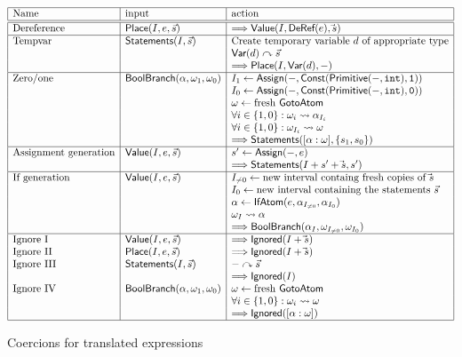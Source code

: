 \begin{docpart}
\begin{figure}\begin{displaymath}\begin{array}{|l|l|l|}
\hline
\mbox{Name} & \mbox{input} & \mbox{action} \\
\hline
\hline
\mbox{Dereference} & \cons{Place}(I,e,\vec s) &
   ==> \cons{Value}(I,\cons{DeRef}(e),\vec s) \\
\hline
\mbox{Tempvar} & \cons{Statements}(I,\vec s) &
   \mbox{Create temporary variable $d$ of appropriate type} \\
&& \installleft{\cons{Var}(d)}{\vec s} \\
&& ==> \cons{Place}(I,\cons{Var}(d),-) \\
\hline
\mbox{Zero/one} & \cons{BoolBranch}(\alpha,\omega_1,\omega_0) &
   I_1 <- \cons{Assign}(-,\cons{Const}(\cons{Primitive}(-,\syntax{int}),
                        \syntax{1})) \\
&& I_0 <- \cons{Assign}(-,\cons{Const}(\cons{Primitive}(-,\syntax{int}),
                        \syntax{0})) \\
&& \omega <- \mbox{fresh \cons{GotoAtom}} \\
&& \forall i \in \{1,0\}: \atomconnect{\omega_i}{\alpha_{I_i}} \\
&& \forall i \in \{1,0\}: \atomconnect{\omega_{I_i}}{\omega} \\
&& ==> \cons{Statements}([\alpha:\omega],\{s_1,s_0\}) \\
\hline
\mbox{Assignment generation} & \cons{Value}(I,e,\vec s) &
   s' <- \cons{Assign}(-,e) \\
&& ==> \cons{Statements}(I+s'+\vec s,s') \\
\hline
\mbox{If generation} & \cons{Value}(I,e,\vec s) &
   I_{\neq 0} <- \mbox{new interval containg fresh copies of }\vec s \\
&& I_0 <- \mbox{new interval containing the statements }\vec s \\
&& \alpha <- \cons{IfAtom}(e,\alpha_{I_{\neq 0}},\alpha_{I_0}) \\
&& \atomconnect{\omega_I}{\alpha} \\
&& ==> \cons{BoolBranch}(\alpha_I,\omega_{I_{\neq 0}},\omega_{I_0}) \\
\hline
\mbox{Ignore I} & \cons{Value}(I,e,\vec s) &
   ==> \cons{Ignored}(I+\vec s) \\
\mbox{Ignore II} & \cons{Place}(I,e,\vec s) &
   ==> \cons{Ignored}(I+\vec s) \\
\mbox{Ignore III} & \cons{Statements}(I,\vec s) &
   \installleft{-}{\vec s} \\
&& ==> \cons{Ignored}(I) \\
\mbox{Ignore IV} & \cons{BoolBranch}(\alpha,\omega_1,\omega_0) &
   \omega <- \mbox{fresh \cons{GotoAtom}} \\
&& \forall i \in \{1,0\}: \atomconnect{\omega_i}{\omega} \\
&& ==> \cons{Ignored}([\alpha:\omega]) \\
\hline
\end{array}\end{displaymath}
\caption{Coercions for translated expressions}
\label{fig:c2coreCoerce}
\end{figure}


\end{docpart}
